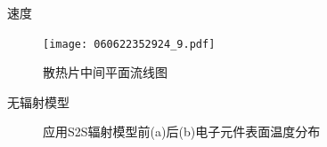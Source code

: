 \documentclass[UTF8,9pt]{ctexbeamer}
\begin{document}
\begin{frame}{速度}
	\begin{figure}
		\texttt{[image: 060622352924\_9.pdf]}
		\caption{散热片中间平面流线图}
	\end{figure}	
\end{frame}
\begin{frame}{无辐射模型}
	\begin{figure}[htbp]
		\centering
	   \caption{应用S2S辐射模型前(a)后(b)电子元件表面温度分布}
	   \label{fig:14}
	   \end{figure}
\end{frame}
\end{document}
